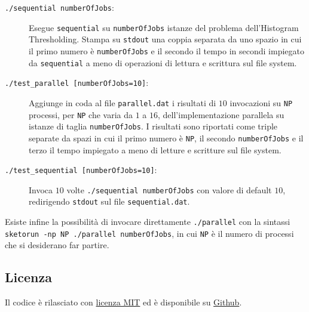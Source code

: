 \documentclass[12pt]{article}
\begin{document}
      \begin{description}
        \item[\texttt{./sequential numberOfJobs}:] Esegue \texttt{sequential}
          su \texttt{numberOfJobs} istanze del problema dell'Histogram
          Thresholding. Stampa su \texttt{stdout} una coppia separata da uno
          spazio in cui il primo numero \`e \texttt{numberOfJobs} e il secondo
          il tempo in secondi impiegato da \texttt{sequential} a meno di
          operazioni di lettura e scrittura sul file system. 
        \item[\texttt{./test\_parallel [numberOfJobs=10]}:] Aggiunge in coda al file
          \texttt{parallel.dat} i risultati di \(10\) invocazioni su \texttt{NP}
          processi, per \texttt{NP} che varia da \(1\) a \(16\),
          dell'implementazione parallela su istanze di taglia
          \texttt{numberOfJobs}. I risultati sono riportati come triple separate
          da spazi in cui il primo numero \`e \texttt{NP}, il secondo
          \texttt{numberOfJobs} e il terzo il tempo impiegato a meno di
          letture e scritture sul file system.
        \item[\texttt{./test\_sequential [numberOfJobs=10]}:] Invoca \(10\)
          volte \texttt{./sequential numberOfJobs} con valore di default \(10\),
          redirigendo \texttt{stdout} sul file \texttt{sequential.dat}.
      \end{description}

      Esiste infine la possibilit\`a di invocare direttamente
      \texttt{./parallel} con la sintassi
      \texttt{sketorun -np NP ./parallel numberOfJobs}, in cui \texttt{NP} \`e
      il numero di processi che si desiderano far partire.

      \subsection{Licenza}

      Il codice \`e rilasciato con \href{http://opensource.org/licenses/MIT}{licenza MIT}
      ed \`e disponibile su \href{https://github.com/jacquerie/SPM}{Github}.
\end{document}
